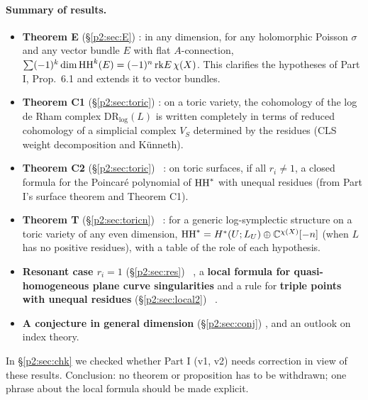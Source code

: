 \paragraph{Summary of results.}
\begin{itemize}
\item \textbf{Theorem E} (\S\ref{p2:sec:E}) \tP: in any dimension, for any holomorphic Poisson $\sigma$ and any vector bundle $E$ with flat $A$-connection, $\sum(-1)^k\dim\mathrm{HH}^k(E)=(-1)^n\,\mathrm{rk} E\,\chi(X)$. This clarifies the hypotheses of Part I, Prop.\ 6.1 and extends it to vector bundles.
\item \textbf{Theorem C1} (\S\ref{p2:sec:toric}) \tP: on a toric variety, the cohomology of the log de Rham complex $\mathrm{DR}_{\log}(L)$ is written completely in terms of reduced cohomology of a simplicial complex $V_S$ determined by the residues (CLS weight decomposition and K\"unneth).
\item \textbf{Theorem C2} (\S\ref{p2:sec:toric}) \tP\ \tV: on toric surfaces, if all $r_i\ne1$, a closed formula for the Poincar\'e polynomial of $\mathrm{HH}^*$ with unequal residues (from Part I's surface theorem and Theorem C1).
\item \textbf{Theorem T} (\S\ref{p2:sec:toricn}) \tP\ \tV: for a generic log-symplectic structure on a toric variety of any even dimension, $\mathrm{HH}^*=H^*(U;L_U)\oplus\mathbb C^{\chi(X)}[-n]$ (when $L$ has no positive residues), with a table of the role of each hypothesis.
\item \textbf{Resonant case $r_i=1$} (\S\ref{p2:sec:res}) \tV\ \tK, a \textbf{local formula for quasi-homogeneous plane curve singularities} and a rule for \textbf{triple points with unequal residues} (\S\ref{p2:sec:local2}) \tV\ \tK.
\item \textbf{A conjecture in general dimension} (\S\ref{p2:sec:conj}) \tK, and an outlook on index theory.
\end{itemize}
In \S\ref{p2:sec:chk} we checked whether Part I (v1, v2) needs correction in view of these results. Conclusion: no theorem or proposition has to be withdrawn; one phrase about the local formula should be made explicit.

